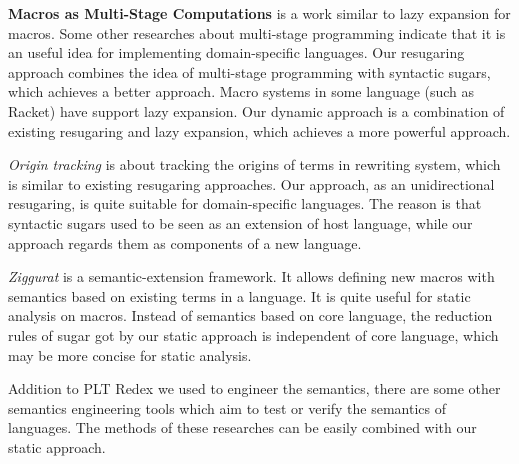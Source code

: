 {\bfseries Macros as Multi-Stage Computations\cite{multistage}} is a work similar to lazy expansion for macros. Some other researches\cite{modularstaging} about multi-stage programming\cite{MSP} indicate that it is an useful idea for implementing domain-specific languages. Our resugaring approach combines the idea of multi-stage programming with syntactic sugars, which achieves a better approach. Macro systems in some language (such as Racket\cite{racket}) have support lazy expansion. Our dynamic approach is a combination of existing resugaring and lazy expansion, which achieves a more powerful approach.

\emph{Origin tracking}\cite{origintracking} is about tracking the origins of terms in rewriting system, which is similar to existing resugaring approaches. Our approach, as an unidirectional resugaring, is quite suitable for domain-specific languages. The reason is that syntactic sugars used to be seen as an extension of host language, while our approach regards them as components of a new language.

\emph{Ziggurat}\cite{Ziggurat} is a semantic-extension framework. It allows defining new macros with semantics based on existing terms in a language. It is quite useful for static analysis on macros. Instead of semantics based on core language, the reduction rules of sugar got by our static approach is independent of core language, which may be more concise for static analysis.

Addition to PLT Redex\cite{SEwPR} we used to engineer the semantics, there are some other semantics engineering tools\cite{dynsem,Ksemantic} which aim to test or verify the semantics of languages. The methods of these researches can be easily combined with our static approach.



